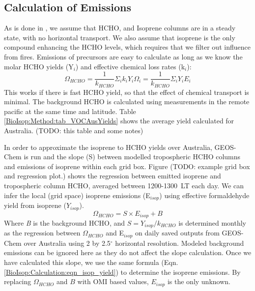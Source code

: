     
    
  \subsection{Calculation of Emissions}
    \label{BioIsop:Calculation}
   
    As is done in \textcite{Palmer2003, Millet2006, Bauwens2016}, we assume that HCHO, and Isoprene columns are in a steady state, with no horizontal transport.
    We also assume that isoprene is the only compound enhancing the HCHO levels, which requires that we filter out influence from fires.
    Emissions of precursors are easy to calculate as long as we know the molar HCHO yields (Y$_i$) and effective chemical loss rates (k$_i$):
    \begin{equation}
    \Omega_{HCHO} = \frac{1}{k_{HCHO}}\Sigma_i k_i Y_i \Omega_i = \frac{1}{k_{HCHO}}\Sigma_i Y_i E_i
    \end{equation}
    This works if there is fast HCHO yield, so that the effect of chemical transport is minimal.
    The background HCHO is calculated using measurements in the remote pacific at the same time and latitude.
    Table \ref{BioIsop:Method:tab_VOCAusYields} shows the average yield calculated for Australia. (TODO: this table and some notes)
    
    In order to approximate the isoprene to HCHO yields over Australia, GEOS-Chem is run and the slope (S) between modelled tropospheric HCHO columns and emissions of isoprene within each grid box. 
    Figure (TODO: example grid box and regression plot.) shows the regression between emitted isoprene and tropospheric column HCHO, averaged between 1200-1300~LT each day.
    We can infer the local (grid space) isoprene emissions (E$_{isop}$) using effective formaldehyde yield from isoprene ($Y_{isop}$).
    \begin{equation} \label{BioIsop:Calculation:eqn_isop_yield}
    \Omega_{HCHO} = S \times E_{isop} + B
    \end{equation}
    Where \textit{B} is the background HCHO, and $S = Y_{isop}/k_{HCHO}$ is determined monthly as the regression between $\Omega_{HCHO}$ and E$_{isop}$ on daily saved outputs from GEOS-Chem over Australia using 2 by 2.5$^{\circ}$ horizontal resolution. 
    Modeled background emissions can be ignored here as they do not affect the slope calculation.
    Once we have calculated this slope, we use the same formula (Eqn. \ref{BioIsop:Calculation:eqn_isop_yield}) to determine the isoprene emissions.
    By replacing $\Omega_{HCHO}$ and $B$ with OMI based values, $E_{isop}$ is the only unknown.
    
